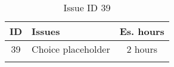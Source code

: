 \begin{longtable} { | c | p{12cm} | c | } 
\hline
	ID 	&	Issues	&		 Es. hours \\\hline
	39 	&	Choice placeholder	&	2 hours \\\hline
\caption{Issue ID 39}
\label{tab:spr3_choiceplaceholder}
\end{longtable}
